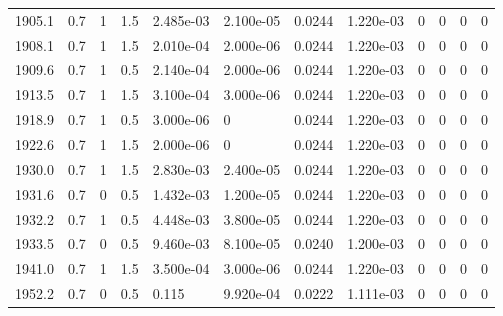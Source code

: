 \documentclass[preview]{standalone}
\begin{document}
{{{{{{{{{{{\begin{tabular}{L{1.2cm}C{1.2cm} C{0.3cm}C{0.5cm} C{1.4cm}C{1.4cm} C{1.4cm}C{1.4cm} C{1.6cm}C{1.6cm} C{1.6cm}C{1.6cm}}
  1905.1  &   0.7  & 1     & 1.5 &  2.485e-03  & 2.100e-05  &  0.0244&   1.220e-03& 0 & 0   &  0 & 0  \\ 
  1908.1  &   0.7  & 1     & 1.5 &  2.010e-04  & 2.000e-06  &  0.0244&   1.220e-03& 0 & 0   &  0 & 0  \\ 
  1909.6  &   0.7  & 1     & 0.5 &  2.140e-04  & 2.000e-06  &  0.0244&   1.220e-03& 0 & 0   &  0 & 0  \\ 
  1913.5  &   0.7  & 1     & 1.5 &  3.100e-04  & 3.000e-06  &  0.0244&   1.220e-03& 0 & 0   &  0 & 0  \\ 
  1918.9  &   0.7  & 1     & 0.5 &  3.000e-06  & 0  &  0.0244&   1.220e-03& 0 & 0   &  0 & 0  \\ 
  1922.6  &   0.7  & 1     & 1.5 &  2.000e-06  & 0  &  0.0244&   1.220e-03& 0 & 0   &  0 & 0  \\ 
  1930.0  &   0.7  & 1     & 1.5 &  2.830e-03  & 2.400e-05  &  0.0244&   1.220e-03& 0 & 0   &  0 & 0  \\ 
  1931.6  &   0.7  & 0     & 0.5 &  1.432e-03  & 1.200e-05  &  0.0244&   1.220e-03& 0 & 0   &  0 & 0  \\ 
  1932.2  &   0.7  & 1     & 0.5 &  4.448e-03  & 3.800e-05  &  0.0244&   1.220e-03& 0 & 0   &  0 & 0  \\ 
  1933.5  &   0.7  & 0     & 0.5 &  9.460e-03  & 8.100e-05  &  0.0240&   1.200e-03& 0 & 0   &  0 & 0  \\ 
  1941.0  &   0.7  & 1     & 1.5 &  3.500e-04  & 3.000e-06  &  0.0244&   1.220e-03& 0 & 0   &  0 & 0  \\ 
  1952.2  &   0.7  & 0     & 0.5 &  0.115  & 9.920e-04  &  0.0222&   1.111e-03& 0 & 0   &  0 & 0  \\ 
\hline 
\end{tabular} 

}}}}}}}}}}}
\end{document}
